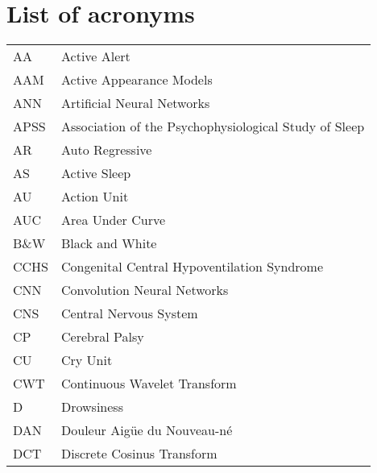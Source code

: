 \chapter*{List of acronyms}


\begin{tabular}{ll}
AA & Active Alert \\
AAM & Active Appearance Models \\
ANN & Artificial Neural Networks \\
APSS & Association of the Psychophysiological Study of Sleep \\ 
AR & Auto Regressive \\
AS & Active Sleep \\
AU & Action Unit \\
AUC & Area Under Curve \\
B\&W & Black and White \\
CCHS & Congenital Central Hypoventilation Syndrome \\
CNN & Convolution Neural Networks \\
CNS & Central Nervous System \\
CP & Cerebral Palsy \\
CU & Cry Unit \\
CWT & Continuous Wavelet Transform \\
D & Drowsiness \\
DAN & Douleur Aig{\"u}e du Nouveau-n{\'e} \\
DCT & Discrete Cosinus Transform \\

\end{tabular}

